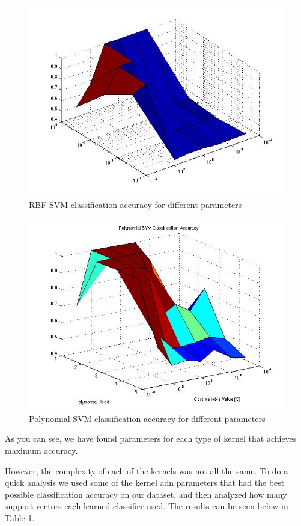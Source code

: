 \documentclass[paper=a4, fontsize=11pt]{scrartcl} %
\begin{document}
\begin{figure}
\centering
\includegraphics[scale=0.4]{RBF2.jpg}
\caption{RBF SVM classification accuracy for different parameters}
\label{fig:plot_2d}
\end{figure}

\begin{figure}
\centering
\includegraphics[scale=0.4]{Ploy.jpg}
\caption{Polynomial SVM classification accuracy for different parameters }
\label{fig:plot_2d}
\end{figure}

As you can see, we have found parameters for each type of kernel that achieves maximum accuracy. 

However, the complexity of each of the kernels was not all the same.  
To do a quick analysis we used some of the kernel adn parameters that had the best possible classification accuracy on our dataset, and then analyzed how many support vectors each learned classifier used.
The results can be seen below in Table 1.
\end{document}
